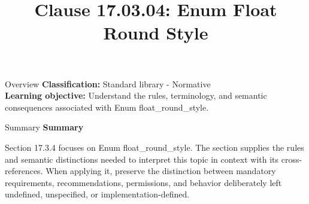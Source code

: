 \documentclass[10pt,letterpaper]{article}
\title{Clause 17.03.04: Enum Float Round Style}
\author{}
\date{}
\begin{document}
\maketitle
\begin{CornellOverviewBox}{Overview}
\textbf{Classification:} Standard library - Normative\\[2pt]
\textbf{Learning objective:} Understand the rules, terminology, and semantic consequences associated with Enum float\_round\_style.
\end{CornellOverviewBox}\begin{CornellSummaryBox}{Summary}
{\sffamily\bfseries\color{Accent} Summary}\par\vspace{3pt}Section 17.3.4 focuses on Enum float\_round\_style. The section supplies the rules and semantic distinctions needed to interpret this topic in context with its cross-references. When applying it, preserve the distinction between mandatory requirements, recommendations, permissions, and behavior deliberately left undefined, unspecified, or implementation-defined.
\end{CornellSummaryBox}
\end{document}
